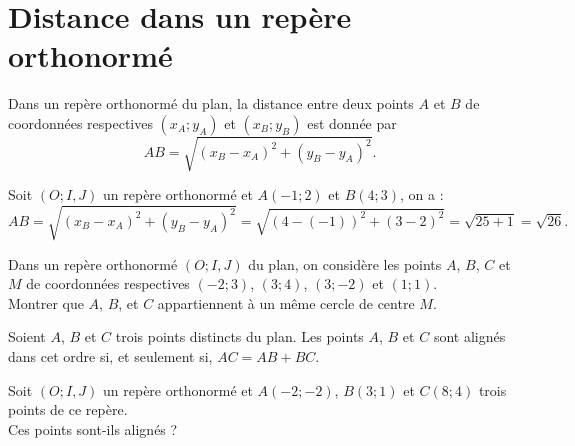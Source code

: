 \documentclass[11pt]{article}
\begin{document}
\section{Distance dans un repère orthonormé}
\begin{prop}
  Dans un repère orthonormé du plan, la distance entre deux points $A$ et $B$ de
  coordonnées respectives $(x_A; y_A)$ et $(x_B; y_B)$ est donnée par
  \[
    AB = \sqrt{(x_B-x_A)^2+(y_B-y_A)^2}.
  \]
\end{prop}

\begin{exemple}
  Soit $(O; I, J)$ un repère orthonormé et $A(-1; 2)$ et $B(4; 3)$, on a :
  \[
    AB = \sqrt{(x_B-x_A)^2+(y_B-y_A)^2} = \sqrt{(4-(-1))^2+(3-2)^2} =
    \sqrt{25+1}=\sqrt{26}.
  \]
\end{exemple}

\begin{app}
  Dans un repère orthonormé $(O; I, J)$ du plan, on considère les points $A$,
  $B$, $C$ et $M$ de coordonnées respectives $(-2; 3)$, $(3; 4)$, $(3; -2)$ et
  $(1; 1)$.\\
  Montrer que $A$, $B$, et $C$ appartiennent à un même cercle de centre $M$.
\end{app}

\begin{prop}
  Soient $A$, $B$ et $C$ trois points distincts du plan. Les points $A$, $B$ et
  $C$ sont alignés dans cet ordre si, et seulement si, $AC = AB+BC$.
\end{prop}

\begin{exemple}
  Soit $(O; I, J)$ un repère orthonormé et $A(-2; -2)$, $B(3; 1)$ et
  $C(8; 4)$ trois points de ce repère.\\
  Ces points sont-ils alignés ?
\end{exemple}
\end{document}
